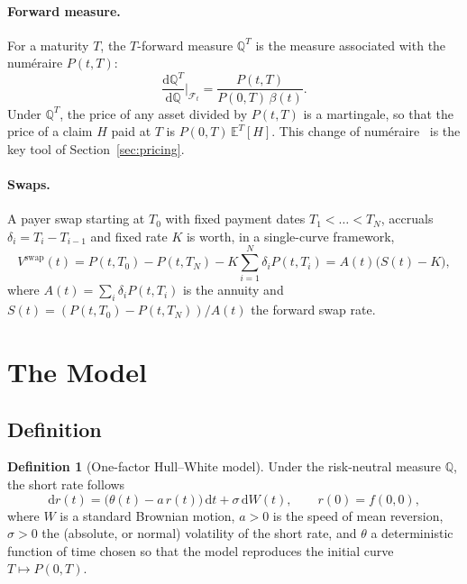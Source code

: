 \documentclass[11pt,a4paper]{article}
\theoremstyle{plain}
\theoremstyle{definition}
\newtheorem{definition}[theorem]{Definition}
\newcommand{\dd}{\mathrm{d}}
\newcommand{\E}{\mathbb{E}}
\newcommand{\Q}{\mathbb{Q}}
\newcommand{\F}{\mathcal{F}}
\begin{document}
\paragraph{Forward measure.} For a maturity $T$, the $T$-forward measure $\Q^T$ is the measure associated with the numéraire $P(t,T)$:
\begin{equation}
    \frac{\dd\Q^T}{\dd\Q}\Big|_{\F_t}=\frac{P(t,T)}{P(0,T)\,\beta(t)}.
\end{equation}
Under $\Q^T$, the price of any asset divided by $P(t,T)$ is a martingale, so that the price of a claim $H$ paid at $T$ is $P(0,T)\,\E^{T}[H]$. This change of numéraire~\cite{geman} is the key tool of Section~\ref{sec:pricing}.

\paragraph{Swaps.} A payer swap starting at $T_0$ with fixed payment dates $T_1<\dots<T_N$, accruals $\delta_i=T_i-T_{i-1}$ and fixed rate $K$ is worth, in a single-curve framework,
\begin{equation}
    V^{\text{swap}}(t)=P(t,T_0)-P(t,T_N)-K\sum_{i=1}^N\delta_iP(t,T_i)
    =A(t)\bigl(S(t)-K\bigr),
    \label{eq:swap}
\end{equation}
where $A(t)=\sum_i\delta_iP(t,T_i)$ is the annuity and $S(t)=(P(t,T_0)-P(t,T_N))/A(t)$ the forward swap rate.

\clearpage
\section{The Model}
\label{sec:model}

\subsection{Definition}
\begin{definition}[One-factor Hull--White model]
Under the risk-neutral measure $\Q$, the short rate follows
\begin{equation}
    \dd r(t)=\bigl(\theta(t)-a\,r(t)\bigr)\,\dd t+\sigma\,\dd W(t),
    \qquad r(0)=f(0,0),
    \label{eq:hw}
\end{equation}
where $W$ is a standard Brownian motion, $a>0$ is the speed of mean reversion, $\sigma>0$ the (absolute, or normal) volatility of the short rate, and $\theta$ a deterministic function of time chosen so that the model reproduces the initial curve $T\mapsto P(0,T)$.
\end{definition}
\end{document}
